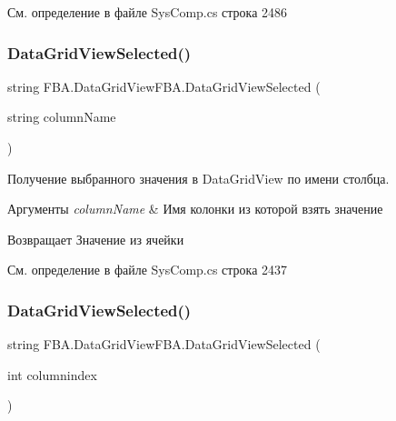 См. определение в файле Sys\+Comp.\+cs строка 2486

\mbox{\label{class_f_b_a_1_1_data_grid_view_f_b_a_a3a5c48eba36f68240ed3f960dda77473}} 
\subsubsection{\texorpdfstring{Data\+Grid\+View\+Selected()}{DataGridViewSelected()}\hspace{0.1cm}{\footnotesize\ttfamily [1/2]}}
{\footnotesize\ttfamily string F\+B\+A.\+Data\+Grid\+View\+F\+B\+A.\+Data\+Grid\+View\+Selected (\begin{DoxyParamCaption}\item[{string}]{column\+Name }\end{DoxyParamCaption})}



Получение выбранного значения в Data\+Grid\+View по имени столбца. 


\begin{DoxyParams}{Аргументы}
{\em column\+Name} & Имя колонки из которой взять значение\\
\hline
\end{DoxyParams}
\begin{DoxyReturn}{Возвращает}
Значение из ячейки
\end{DoxyReturn}


См. определение в файле Sys\+Comp.\+cs строка 2437

\mbox{\label{class_f_b_a_1_1_data_grid_view_f_b_a_a3f33f55c2ebad8ed7f4e3d10e6064b72}} 
\subsubsection{\texorpdfstring{Data\+Grid\+View\+Selected()}{DataGridViewSelected()}\hspace{0.1cm}{\footnotesize\ttfamily [2/2]}}
{\footnotesize\ttfamily string F\+B\+A.\+Data\+Grid\+View\+F\+B\+A.\+Data\+Grid\+View\+Selected (\begin{DoxyParamCaption}\item[{int}]{columnindex }\end{DoxyParamCaption})}



